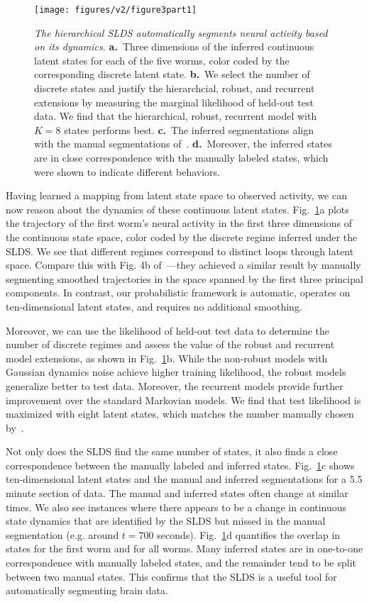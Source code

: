 \documentclass[11pt]{article}
\begin{document}
\begin{figure}[t!]
\centering
\texttt{[image: figures/v2/figure3part1]} 
\caption{ \textit{The hierarchical SLDS automatically segments neural
  activity based on its dynamics.}
  \textbf{a.}~Three dimensions of the inferred continuous latent states
  for each of the five worms, color coded by the corresponding discrete latent
  state.
  \textbf{b.}~We select the number of discrete states and justify the
  hierarchcial, robust, and recurrent extensions by measuring the marginal likelihood
  of held-out test data. We find that the hierarchical, robust, recurrent model
  with~$K=8$ states performs best.
  \textbf{c.}~The inferred segmentations align with the manual segmentations
  of~\citet{kato2015global}.
  \textbf{d.}~Moreover, the inferred states are in close correspondence with
  the manually labeled states, which were shown to indicate different behaviors.
}
\label{fig:syllables}
\end{figure}

Having learned a mapping from latent state space to observed activity,
we can now reason about the dynamics of these continuous latent
states. Fig.~\ref{fig:syllables}a plots the trajectory of the first
worm's neural activity in the first three dimensions of the continuous
state space, color coded by the discrete regime inferred under the
SLDS.  We see that different regimes correspond to distinct loops
through latent space.  Compare this with Fig. 4b
of~\citet{kato2015global}---they achieved a similar result by manually
segmenting smoothed trajectories in the space spanned by the first
three principal components.  In contrast, our probabilistic framework
is automatic, operates on ten-dimensional latent states, and requires
no additional smoothing.

Moreover, we can use the likelihood of held-out test data to determine
the number of discrete regimes and assess the value of the robust and
recurrent model extensions, as shown in Fig.~\ref{fig:syllables}b.
While the non-robust models with Gaussian dynamics noise achieve
higher training likelihood, the robust models generalize better to
test data.  Moreover, the recurrent models provide further improvement
over the standard Markovian models.  We find that test likelihood is
maximized with eight latent states, which matches the number manually
chosen by~\citet{kato2015global}.

Not only does the SLDS find the same number of states, it also finds a
close correspondence between the manually labeled and inferred states.
Fig.~\ref{fig:syllables}c shows ten-dimensional latent states and the
manual and inferred segmentations for a 5.5 minute section of data.
The manual and inferred states often change at similar times. We also
see instances where there appears to be a change in continuous state
dynamics that are identified by the SLDS but missed in the manual
segmentation (e.g. around $t=700$ seconds).  Fig.~\ref{fig:syllables}d
quantifies the overlap in states for the first worm and for all worms.
Many inferred states are in one-to-one correspondence with manually
labeled states, and the remainder tend to be split between two manual
states.  This confirms that the SLDS is a useful tool for automatically
segmenting brain data.
\end{document}
